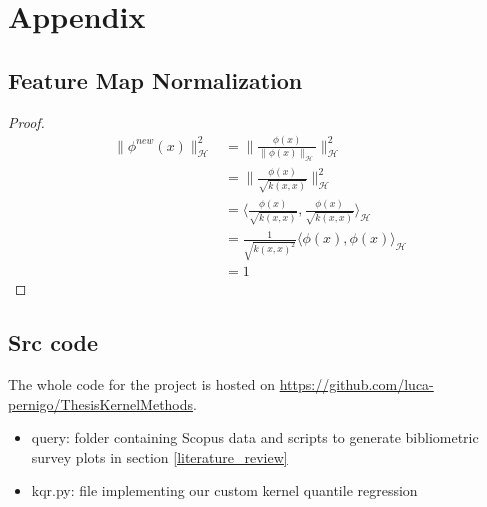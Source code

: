 \chapter{Appendix}
\section{Feature Map Normalization}\label{appendix:new_feature}
\begin{proof}
\begin{align*}
    \|
    \phi^{new}(x)\|_{\mathcal{H}}^{2} &= \|\frac{\phi(x)}{\|\phi(x)\|_{\mathcal{H}}}
    \|_{\mathcal{H}}^{2}
    \\
    &=
    \|
    \frac{\phi(x)}
    {\sqrt{k(x,x)}}
    \|_{\mathcal{H}}^{2}
    \\
    &=
    \langle
    \frac{\phi(x)}
    {\sqrt{k(x,x)}}
    ,
    \frac{\phi(x)}
    {\sqrt{k(x,x)}}
    \rangle_{\mathcal{H}}
    \\
    &=
    \frac{1}{\sqrt{k(x,x)^{2}}}
    \langle
    \phi(x)
    ,
    \phi(x)
    \rangle_{\mathcal{H}}
    \\
    &=1
\end{align*}
\end{proof}

\newpage
\section{Src code}\label{src_code}
The whole code for the project is hosted on
\url{https://github.com/luca-pernigo/ThesisKernelMethods}\label{github_repo}.
\\
\begin{itemize}
    \item query: folder containing Scopus data and scripts to generate bibliometric survey plots in section \ref{literature_review}
    \item kqr.py: file implementing our custom kernel quantile regression
\end{itemize}
